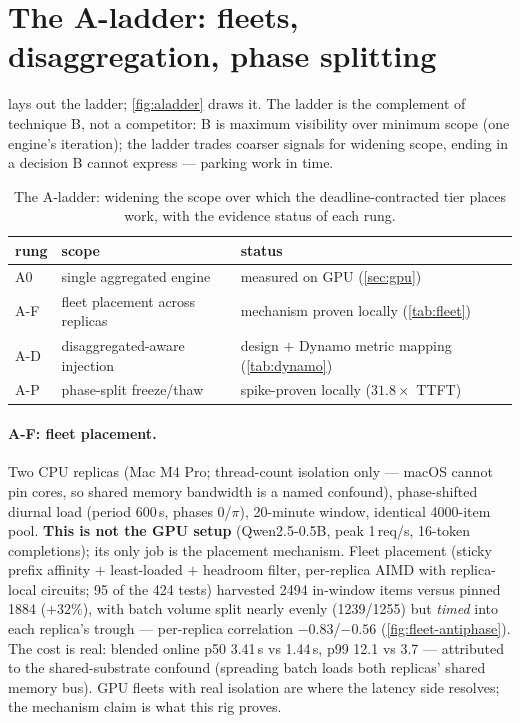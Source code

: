 \documentclass[conference]{IEEEtran}
\begin{document}
\section{The A-ladder: fleets, disaggregation, phase splitting}
\label{app:ladder}

 lays out the ladder; \cref{fig:aladder} draws it. The ladder is the
complement of technique B, not a competitor: B is maximum visibility over minimum scope
(one engine's iteration); the ladder trades coarser signals for widening scope, ending
in a decision B cannot express --- parking work in time.

\begin{table}[!htbp]
\centering
\caption{The A-ladder: widening the scope over which the deadline-contracted tier
places work, with the evidence status of each rung.}
\label{tab:taxonomy}
\footnotesize
\setlength{\tabcolsep}{3.5pt}
\begin{tabular}{ll>{\raggedright\arraybackslash}p{3.15cm}}
\toprule
rung & scope & status \\
\midrule
A0  & single aggregated engine        & measured on GPU (\cref{sec:gpu}) \\
A-F & fleet placement across replicas & mechanism proven locally (\cref{tab:fleet}) \\
A-D & disaggregated-aware injection   & design $+$ Dynamo metric mapping (\cref{tab:dynamo}) \\
A-P & phase-split freeze/thaw         & spike-proven locally ($31.8\times$ TTFT) \\
\bottomrule
\end{tabular}
\end{table}



\paragraph{A-F: fleet placement.} Two CPU replicas (Mac M4 Pro; thread-count isolation
only --- macOS cannot pin cores, so shared memory bandwidth is a named confound),
phase-shifted diurnal load (period 600\,s, phases $0$/$\pi$), 20-minute window,
identical 4000-item pool. \textbf{This is not the GPU setup} (Qwen2.5-0.5B, peak
1\,req/s, 16-token completions); its only job is the placement mechanism. Fleet
placement (sticky prefix affinity $+$ least-loaded $+$ headroom filter, per-replica AIMD
with replica-local circuits; 95 of the 424 tests) harvested 2494 in-window items versus
pinned 1884 ($+32\%$), with batch volume split nearly evenly (1239/1255) but \emph{timed}
into each replica's trough --- per-replica correlation $-0.83$/$-0.56$
(\cref{fig:fleet-antiphase}). The cost is real: blended online p50 3.41\,s vs 1.44\,s,
p99 12.1 vs 3.7 --- attributed to the shared-substrate confound (spreading batch loads
both replicas' shared memory bus). GPU fleets with real isolation are where the latency
side resolves; the mechanism claim is what this rig proves.
\end{document}
